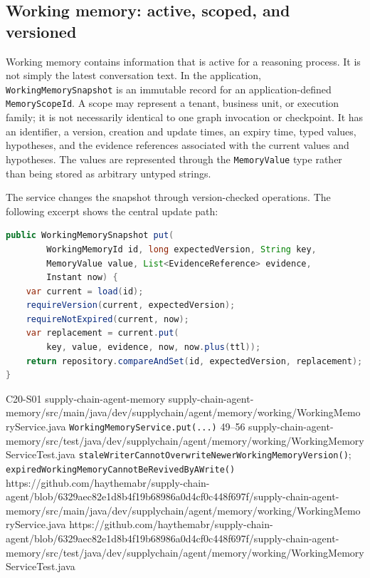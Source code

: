 \subsection{Working memory: active, scoped, and versioned}
\label{subsec:ch20-working-memory}

Working memory contains information that is active for a reasoning process. It is not simply the latest conversation text. In the application, \texttt{WorkingMemorySnapshot} is an immutable record for an application-defined \texttt{MemoryScopeId}. A scope may represent a tenant, business unit, or execution family; it is not necessarily identical to one graph invocation or checkpoint. It has an identifier, a version, creation and update times, an expiry time, typed values, hypotheses, and the evidence references associated with the current values and hypotheses. The values are represented through the \texttt{MemoryValue} type rather than being stored as arbitrary untyped strings.

The service changes the snapshot through version-checked operations. The following excerpt shows the central update path:

\begin{minipage}{\linewidth}
\begin{lstlisting}[language=Java,caption={Updating one working-memory slot with version and expiry checks.},label={lst:ch20-working-memory-put}]
public WorkingMemorySnapshot put(
        WorkingMemoryId id, long expectedVersion, String key,
        MemoryValue value, List<EvidenceReference> evidence,
        Instant now) {
    var current = load(id);
    requireVersion(current, expectedVersion);
    requireNotExpired(current, now);
    var replacement = current.put(
        key, value, evidence, now, now.plus(ttl));
    return repository.compareAndSet(id, expectedVersion, replacement);
}
\end{lstlisting}
\end{minipage}

\BookSourceReferenceQR
  {C20-S01}
  {supply-chain-agent-memory}
  {supply-chain-agent-memory/src/main/java/dev/supplychain/agent/memory/working/WorkingMemoryService.java}
  {\texttt{WorkingMemoryService.put(...)}}
  {49--56}
  {supply-chain-agent-memory/src/test/java/dev/supplychain/agent/memory/working/WorkingMemoryServiceTest.java}
  {\texttt{staleWriterCannotOverwriteNewerWorkingMemoryVersion()}; \texttt{expiredWorkingMemoryCannotBeRevivedByAWrite()}}
  {https://github.com/haythemabr/supply-chain-agent/blob/6329aec82e1d8b4f19b68986a0d4cf0c448f697f/supply-chain-agent-memory/src/main/java/dev/supplychain/agent/memory/working/WorkingMemoryService.java}
  {https://github.com/haythemabr/supply-chain-agent/blob/6329aec82e1d8b4f19b68986a0d4cf0c448f697f/supply-chain-agent-memory/src/test/java/dev/supplychain/agent/memory/working/WorkingMemoryServiceTest.java}


